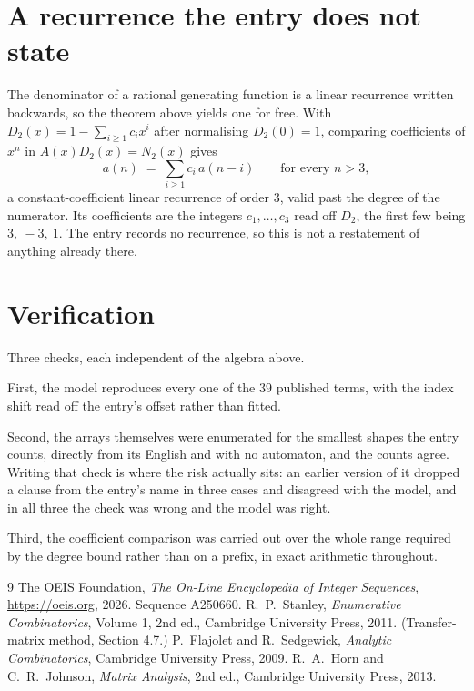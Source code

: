 \documentclass[11pt,a4paper]{article}
\theoremstyle{plain}
\theoremstyle{definition}
\begin{document}
\section{A recurrence the entry does not state}

The denominator of a rational generating function is a linear recurrence written backwards, so
the theorem above yields one for free. With $D_2(x)=1-\sum_{i\ge1}c_ix^i$ after normalising
$D_2(0)=1$, comparing coefficients of $x^n$ in $A(x)D_2(x)=N_2(x)$ gives
\[
a(n)\;=\;\sum_{i\ge1}c_i\,a(n-i)\qquad\text{for every }n>3,
\]
a constant-coefficient linear recurrence of order $3$, valid past the degree of the
numerator. Its coefficients are the integers $c_1,\dots,c_{3}$ read off $D_2$, the first few being $3,\ -3,\ 1$. The entry records no recurrence, so this is not a restatement of anything
already there.

\section{Verification}

Three checks, each independent of the algebra above.

First, the model reproduces every one of the $39$ published terms, with the index shift
read off the entry's offset rather than fitted.

Second, the arrays themselves were enumerated for the smallest shapes the entry counts,
directly from its English and with no automaton, and the counts agree. Writing that check is
where the risk actually sits: an earlier version of it dropped a clause from the entry's name
in three cases and disagreed with the model, and in all three the check was wrong and the model
was right.

Third, the coefficient comparison was carried out over the whole range required by the degree
bound rather than on a prefix, in exact arithmetic throughout.

\begin{thebibliography}{9}
 The OEIS Foundation, \emph{The On-Line Encyclopedia of Integer
Sequences}, \url{https://oeis.org}, 2026. Sequence A250660.
 R.~P.~Stanley, \emph{Enumerative Combinatorics}, Volume 1, 2nd ed.,
Cambridge University Press, 2011. (Transfer-matrix method, Section 4.7.)
 P.~Flajolet and R.~Sedgewick, \emph{Analytic Combinatorics}, Cambridge
University Press, 2009.
 R.~A.~Horn and C.~R.~Johnson, \emph{Matrix Analysis}, 2nd ed., Cambridge
University Press, 2013.
\end{thebibliography}
\end{document}
